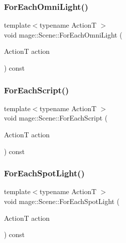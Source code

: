 \hypertarget{classmage_1_1_scene_acd71cef84ec39e63852d5918c7b17863}{}\label{classmage_1_1_scene_acd71cef84ec39e63852d5918c7b17863} 
\subsubsection{\texorpdfstring{For\+Each\+Omni\+Light()}{ForEachOmniLight()}}
{\footnotesize\ttfamily template$<$typename ActionT $>$ \\
void mage\+::\+Scene\+::\+For\+Each\+Omni\+Light (\begin{DoxyParamCaption}\item[{ActionT}]{action }\end{DoxyParamCaption}) const\hspace{0.3cm}{\ttfamily [private]}}

\hypertarget{classmage_1_1_scene_a4d16d973adce12868b9a0df9d92ef6d6}{}\label{classmage_1_1_scene_a4d16d973adce12868b9a0df9d92ef6d6} 
\subsubsection{\texorpdfstring{For\+Each\+Script()}{ForEachScript()}}
{\footnotesize\ttfamily template$<$typename ActionT $>$ \\
void mage\+::\+Scene\+::\+For\+Each\+Script (\begin{DoxyParamCaption}\item[{ActionT}]{action }\end{DoxyParamCaption}) const}

\hypertarget{classmage_1_1_scene_a51bb697a9d96891bb7502317efff7ec1}{}\label{classmage_1_1_scene_a51bb697a9d96891bb7502317efff7ec1} 
\subsubsection{\texorpdfstring{For\+Each\+Spot\+Light()}{ForEachSpotLight()}}
{\footnotesize\ttfamily template$<$typename ActionT $>$ \\
void mage\+::\+Scene\+::\+For\+Each\+Spot\+Light (\begin{DoxyParamCaption}\item[{ActionT}]{action }\end{DoxyParamCaption}) const\hspace{0.3cm}{\ttfamily [private]}}

